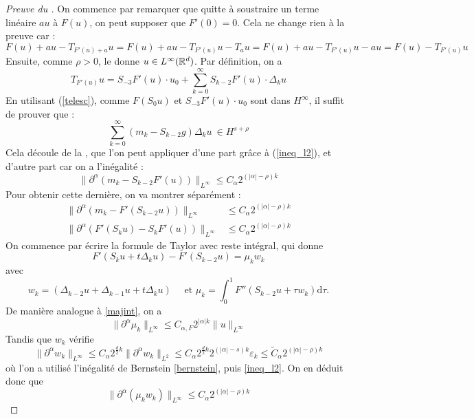 \documentclass[11pt,a4paper]{article}
\begin{document}
\begin{proof}[Preuve du ]On commence par remarquer que quitte à soustraire un terme linéaire $au$ à $F(u)$, on peut supposer que $F'(0)=0$. Cela ne change rien à la preuve car :
\[F(u)+au - T_{F'(u) + a}u = F(u) + au - T_{F'(u)}u  -T_{a}u =  F(u) + au - T_{F'(u)}u  -au =  F(u) - T_{F'(u)}u \]
Ensuite, comme $\rho >0$, le  donne $u\in L^\infty(\mathbb R^d)$. Par définition, on a \[T_{F'(u)}u = S_{-3}F'(u)\cdot u_0 + \sum_{k=0}^\infty S_{k-2} F'(u)\cdot \Delta_k u \]
En utilisant (\ref{telesc}), comme $F(S_0u)$ et $S_{-3}F'(u) \cdot u_0$ sont dans $H^\infty$, il suffit de prouver que :
\[\sum_{k=0}^\infty(m_k-S_{k-2}g)\Delta_k u \ \in H^{s+\rho}\]
Cela découle de la , que l'on peut appliquer d'une part grâce à (\ref{ineq_l2}), et d'autre part car on a l'inégalité :
\begin{equation*}
\| \partial^\alpha (m_k - S_{k-2}F'(u))\|_{L^\infty} \leq C_\alpha 2^{(|\alpha|-\rho)k}
\end{equation*} 
Pour obtenir cette dernière, on va montrer séparément :
\begin{align}
\| \partial^\alpha (m_k - F'(S_{k-2}u))\|_{L^\infty} &\leq C_\alpha 2^{(|\alpha|-\rho)k} \label{eq1} \\
\| \partial^\alpha (F'(S_{k}u) - S_kF'(u))\|_{L^\infty} &\leq C_\alpha 2^{(|\alpha|-\rho)k} \label{eq2}
\end{align}
On commence par écrire la formule de Taylor avec reste intégral, qui donne 
\[F'(S_ku+t\Delta_ku)-F'(S_{k-2}u)=\mu_kw_k\]
avec 
\begin{equation*}
w_k=(\Delta_{k-2}u + \Delta_{k-1}u + t\Delta_ku) \quad \text{ et } \mu_k = \int_0^1F''(S_{k-2}u + \tau w_k)\mathrm{d}\tau.
\end{equation*}
De manière analogue à \eqref{majint}, on a 
\begin{equation*}
\|\partial^\alpha \mu_k \|_{L^\infty} \leq C_{\alpha,F} 2^{|\alpha|k} \|u\|_{L^\infty}
\end{equation*}
Tandis que $w_k$ vérifie
\begin{equation*}
\| \partial^\alpha w_k\|_{L^\infty} \leq C_{\alpha} 2^{\frac{d}{2}k} \| \partial^\alpha w_k\|_{L^2} \leq C_{\alpha} 2^{\frac{d}{2}k} 2^{(|\alpha|-s)k} \varepsilon_k  \leq \tilde{C}_{\alpha} 2^{(|\alpha|-\rho)k}
\end{equation*}
où l'on a utilisé l'inégalité de Bernstein \eqref{bernstein}, puis \eqref{ineq_l2}. On en déduit donc que 
\begin{equation*}
\|\partial^\alpha (\mu_kw_k)\|_{L^\infty} \leq C_\alpha 2^{(|\alpha|-\rho)k} 

\end{equation*}
\end{proof}
\end{document}
